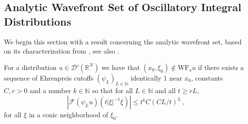 \documentclass[
	fontsize=11pt, 
	twoside=false, 
	abstract=true, 
	a4paper,
]{scrartcl}
\newcommand{\RR}{\mathbb{R}}
\newcommand{\abs}[1]{\left\lvert#1\right\rvert}
\newcommand{\wf}{\mathrm{WF}_{\mathrm{a}}}
\begin{document}
\subsection{Analytic Wavefront Set of Oscillatory Integral Distributions}

We begin this section with a result concerning the analytic wavefront set, based on its characterization from \cite{zbMATH03359011}, see also \cite[Thm.~3.5.13]{MR4436039}. %

\begin{proposition}\label{prop:laxwfa}
	For a distribution $u \in \mathcal{D}'(\RR^N)$ we have that $(x_0,\xi_0) \not\in \wf{u}$ if there exists a sequence of Ehrenpreis cutoffs $(\psi_L)_{L\in\mathbb{N}}$ identically $1$ near $x_0$, constants $C,r>0$ and a number $k \in \mathbb{N}$ so that for all $L\in\mathbb{N}$ and all $t \geq rL$, 
	\begin{equation}\label{eq:laxwfa}
		\abs{\mathcal{F}(\psi_L u)(t\abs{\xi}^{-1}\xi)} \leq t^k C(CL/t)^L\,,
	\end{equation}
	for all $\xi$ in a conic neighborhood of $\xi_0$.
\end{proposition}
\end{document}
